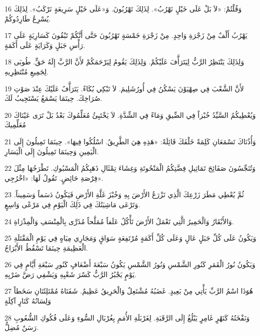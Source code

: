 \par 16 وَقُلْتُمْ: «لاَ بَلْ عَلَى خَيْلٍ نَهْرُبُ». لِذَلِكَ تَهْرُبُونَ. وَ«عَلَى خَيْلٍ سَرِيعَةٍ نَرْكَبُ». لِذَلِكَ يُسْرِعُ طَارِدُوكُمْ.
\par 17 يَهْرُبُ أَلْفٌ مِنْ زَجْرَةِ وَاحِدٍ. مِنْ زَجْرَةِ خَمْسَةٍ تَهْرُبُونَ حَتَّى أَنَّكُمْ تَبْقُونَ كَسَارِيَةٍ عَلَى رَأْسِ جَبَلٍ وَكَرَايَةٍ عَلَى أَكَمَةٍ.
\par 18 وَلِذَلِكَ يَنْتَظِرُ الرَّبُّ لِيَتَرَأَّفَ عَلَيْكُمْ. وَلِذَلِكَ يَقُومُ لِيَرْحَمَكُمْ لأَنَّ الرَّبَّ إِلَهُ حَقٍّ. طُوبَى لِجَمِيعِ مُنْتَظِرِيهِ.
\par 19 لأَنَّ الشَّعْبَ فِي صِهْيَوْنَ يَسْكُنُ فِي أُورُشَلِيمَ. لاَ تَبْكِي بُكَاءً. يَتَرَأَّفُ عَلَيْكَ عِنْدَ صَوْتِ صُرَاخِكَ. حِينَمَا يَسْمَعُ يَسْتَجِيبُ لَكَ.
\par 20 وَيُعْطِيكُمُ السَّيِّدُ خُبْزاً فِي الضِّيقِ وَمَاءً فِي الشِّدَّةِ. لاَ يَخْتَبِئُ مُعَلِّمُوكَ بَعْدُ بَلْ تَرَى عَيْنَاكَ مُعَلِّمِيكَ
\par 21 وَأُذُنَاكَ تَسْمَعَانِ كَلِمَةً خَلْفَكَ قَائِلَةً: «هَذِهِ هِيَ الطَّرِيقُ. اسْلُكُوا فِيهَا». حِينَمَا تَمِيلُونَ إِلَى الْيَمِينِ وَحِينَمَا تَمِيلُونَ إِلَى الْيَسَارِ.
\par 22 وَتُنَجِّسُونَ صَفَائِحَ تَمَاثِيلِ فِضَّتِكُمُ الْمَنْحُوتَةِ وَغِشَاءَ تِمْثَالِ ذَهَبِكُمُ الْمَسْبُوكِ. تَطْرَحُهَا مِثْلَ فِرْصَةِ حَائِضٍ. تَقُولُ لَهَا: «اخْرُجِي».
\par 23 ثُمَّ يُعْطِي مَطَرَ زَرْعِكَ الَّذِي تَزْرَعُ الأَرْضَ بِهِ وَخُبْزَ غَلَّةِ الأَرْضِ فَيَكُونُ دَسَماً وَسَمِيناً. وَتَرْعَى مَاشِيَتُكَ فِي ذَلِكَ الْيَوْمِ فِي مَرْعًى وَاسِعٍ.
\par 24 وَالأَبْقَارُ وَالْحَمِيرُ الَّتِي تَعْمَلُ الأَرْضَ تَأْكُلُ عَلَفاً مُمَلَّحاً مُذَرَّى بِالْمِنْسَفِ وَالْمِذْرَاةِ.
\par 25 وَيَكُونُ عَلَى كُلِّ جَبَلٍ عَالٍ وَعَلَى كُلِّ أَكَمَةٍ مُرْتَفِعَةٍ سَوَاقٍ وَمَجَارِي مِيَاهٍ فِي يَوْمِ الْمَقْتَلَةِ الْعَظِيمَةِ حِينَمَا تَسْقُطُ الأَبْرَاجُ.
\par 26 وَيَكُونُ نُورُ الْقَمَرِ كَنُورِ الشَّمْسِ وَنُورُ الشَّمْسِ يَكُونُ سَبْعَةَ أَضْعَافٍ كَنُورِ سَبْعَةِ أَيَّامٍ فِي يَوْمٍ يَجْبُرُ الرَّبُّ كَسْرَ شَعْبِهِ وَيَشْفِي رَضَّ ضَرْبِهِ.
\par 27 هُوَذَا اسْمُ الرَّبِّ يَأْتِي مِنْ بَعِيدٍ. غَضَبُهُ مُشْتَعِلٌ وَالْحَرِيقُ عَظِيمٌ. شَفَتَاهُ مُمْتَلِئَتَانِ سَخَطاً وَلِسَانُهُ كَنَارٍ آكِلَةٍ
\par 28 وَنَفْخَتُهُ كَنَهْرٍ غَامِرٍ يَبْلُغُ إِلَى الرَّقَبَةِ. لِغَرْبَلَةِ الأُمَمِ بِغُرْبَالِ السُّوءِ وَعَلَى فُكُوكِ الشُّعُوبِ رَسَنٌ مُضِلٌّ.
